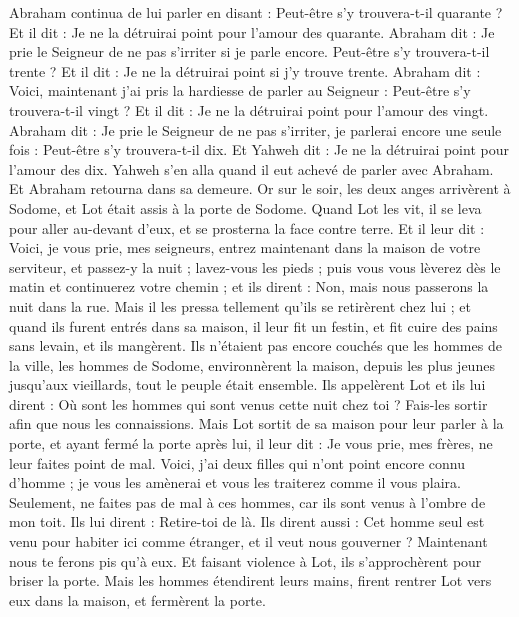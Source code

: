\begin{multicols}{2}
Abraham continua de lui parler en disant : Peut-être s'y trouvera-t-il quarante ? Et il dit : Je ne la détruirai point pour l'amour des quarante.
Abraham dit : Je prie le Seigneur de ne pas s'irriter si je parle encore. Peut-être s'y trouvera-t-il trente ? Et il dit : Je ne la détruirai point si j'y trouve trente.
Abraham dit : Voici, maintenant j'ai pris la hardiesse de parler au Seigneur : Peut-être s'y trouvera-t-il vingt ? Et il dit : Je ne la détruirai point pour l'amour des vingt.
Abraham dit : Je prie le Seigneur de ne pas s'irriter, je parlerai encore une seule fois : Peut-être s'y trouvera-t-il dix. Et Yahweh dit : Je ne la détruirai point pour l'amour des dix.
Yahweh s'en alla quand il eut achevé de parler avec Abraham. Et Abraham retourna dans sa demeure.
\VerseOne{}Or sur le soir, les deux anges arrivèrent à Sodome, et Lot était assis à la porte de Sodome. Quand Lot les vit, il se leva pour aller au-devant d'eux, et se prosterna la face contre terre.
Et il leur dit : Voici, je vous prie, mes seigneurs, entrez maintenant dans la maison de votre serviteur, et passez-y la nuit ; lavez-vous les pieds ; puis vous vous lèverez dès le matin et continuerez votre chemin ; et ils dirent : Non, mais nous passerons la nuit dans la rue.
Mais il les pressa tellement qu'ils se retirèrent chez lui ; et quand ils furent entrés dans sa maison, il leur fit un festin, et fit cuire des pains sans levain, et ils mangèrent.
Ils n'étaient pas encore couchés que les hommes de la ville, les hommes de Sodome, environnèrent la maison, depuis les plus jeunes jusqu'aux vieillards, tout le peuple était ensemble.
Ils appelèrent Lot et ils lui dirent : Où sont les hommes qui sont venus cette nuit chez toi ? Fais-les sortir afin que nous les connaissions.
Mais Lot sortit de sa maison pour leur parler à la porte, et ayant fermé la porte après lui,
il leur dit : Je vous prie, mes frères, ne leur faites point de mal.
Voici, j'ai deux filles qui n'ont point encore connu d'homme ; je vous les amènerai et vous les traiterez comme il vous plaira. Seulement, ne faites pas de mal à ces hommes, car ils sont venus à l'ombre de mon toit.
Ils lui dirent : Retire-toi de là. Ils dirent aussi : Cet homme seul est venu pour habiter ici comme étranger, et il veut nous gouverner ? Maintenant nous te ferons pis qu'à eux. Et faisant violence à Lot, ils s'approchèrent pour briser la porte.
Mais les hommes étendirent leurs mains, firent rentrer Lot vers eux dans la maison, et fermèrent la porte.

\end{multicols}
